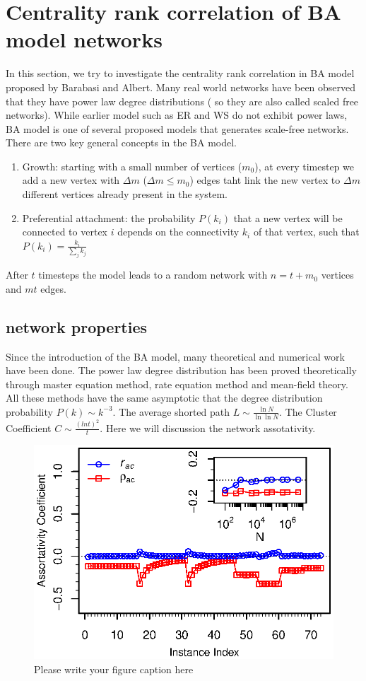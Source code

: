 \documentclass[symmetry,article,submit,moreauthors,pdftex,10pt,a4paper]{Definitions/mdpi}
\begin{document}
\section{Centrality rank correlation of BA model networks}
\label{sec:4}
In this section, we try to investigate the centrality rank correlation in BA model proposed by Barabasi and Albert. Many real world networks have been observed that they have power law degree distributions ( so they are also called scaled free networks). While earlier model such as ER and WS do not exhibit power laws,  BA model is one of several proposed models that generates scale-free networks. There are two key general concepts in the BA model.
\begin{enumerate}
	\item Growth: starting with a small number of vertices ($m_0$), at every timestep we add a new vertex with $\Delta m$ ($\Delta m\le m_0$) edges taht link the new vertex to $\Delta m$ different vertices already present in the system.
	\item Preferential attachment: the probability $P(k_i)$ that a new vertex will be connected to vertex $i$ depends on the connectivity $k_i$ of that vertex, such that $P(k_i)=\frac {k_i}{\sum_{j}{k_j}}$
\end{enumerate}

After $t$ timesteps the model leads to a random network with $n=t+m_0$ vertices and $mt$ edges.

\subsection{network properties}
Since the introduction of the BA model, many theoretical and numerical work have been done. The power law degree distribution has been proved theoretically through master equation method, rate equation method and mean-field theory.  All these methods have the same asymptotic that the degree distribution probability $P(k) \sim k^{-3}$.  The average shorted path $L \sim \frac{\ln N}{\ln\ln N}$. The Cluster Coefficient $C \sim \frac{(lnt)^2}{t}$. Here we will discussion the network assotativity.

\begin{figure}
    \centering
    \includegraphics[width=0.6\columnwidth]{figs/ba-ac}
    \caption{Please write your figure caption here}
    \label{fig:ba-ac}       %
\end{figure}
\end{document}
